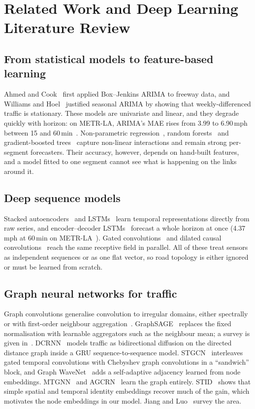 \section{Related Work and Deep Learning Literature Review}
\label{sec:related}

\subsection{From statistical models to feature-based learning}
Ahmed and Cook~\cite{ahmed1979} first applied Box--Jenkins ARIMA to freeway data,
and Williams and Hoel~\cite{williams2003} justified seasonal ARIMA by showing that
weekly-differenced traffic is stationary. These models are univariate and linear,
and they degrade quickly with horizon: on METR-LA, ARIMA's MAE rises from 3.99 to
6.90\,mph between 15 and 60\,min~\cite{li2018dcrnn}. Non-parametric
regression~\cite{smith1997}, random forests~\cite{breiman2001} and gradient-boosted
trees~\cite{friedman2001,chen2016xgboost,ke2017lightgbm} capture non-linear
interactions and remain strong per-segment forecasters. Their accuracy, however,
depends on hand-built features, and a model fitted to one segment cannot see what is
happening on the links around it.

\subsection{Deep sequence models}
Stacked autoencoders~\cite{lv2015} and LSTMs~\cite{hochreiter1997,ma2015lstm}
learn temporal representations directly from raw series, and encoder--decoder
LSTMs~\cite{sutskever2014} forecast a whole horizon at once (4.37\,mph at 60\,min on
METR-LA~\cite{li2018dcrnn}). Gated convolutions~\cite{dauphin2017glu} and dilated
causal convolutions~\cite{oord2016wavenet} reach the same receptive field in
parallel. All of these treat sensors as independent sequences or as one flat vector,
so road topology is either ignored or must be learned from scratch.

\subsection{Graph neural networks for traffic}
Graph convolutions generalise convolution to irregular domains, either
spectrally~\cite{defferrard2016} or with first-order neighbour
aggregation~\cite{kipf2017}. GraphSAGE~\cite{hamilton2017sage} replaces the fixed
normalisation with learnable aggregators such as the neighbour mean; a survey is
given in~\cite{wu2021gnnsurvey}. DCRNN~\cite{li2018dcrnn} models traffic as
bidirectional diffusion on the directed distance graph inside a GRU sequence-to-sequence
model. STGCN~\cite{yu2018stgcn} interleaves gated temporal convolutions with
Chebyshev graph convolutions in a ``sandwich'' block, and Graph
WaveNet~\cite{wu2019gwnet} adds a self-adaptive adjacency learned from node
embeddings. MTGNN~\cite{wu2020mtgnn} and AGCRN~\cite{bai2020agcrn} learn the graph
entirely. STID~\cite{shao2022stid} shows that simple spatial and temporal identity
embeddings recover much of the gain, which motivates the node embeddings in our model.
Jiang and Luo~\cite{jiang2022survey} survey the area.

